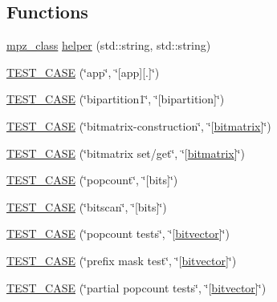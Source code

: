 \subsection*{Functions}
\begin{DoxyCompactItemize}
\item 
\hyperlink{gmpxx_8h_a4194ba637e08ba88fb6b56747cc0ee6c}{mpz\+\_\+class} \hyperlink{namespaceterraces_1_1tests_a740352dfa946b8680c3c25e0edbc87a9}{helper} (std\+::string, std\+::string)
\item 
\hyperlink{namespaceterraces_1_1tests_a111cb207ffb8995599c26f3410048b18}{T\+E\+S\+T\+\_\+\+C\+A\+SE} (\char`\"{}app\char`\"{}, \char`\"{}\mbox{[}app\mbox{]}\mbox{[}.\mbox{]}\char`\"{})
\item 
\hyperlink{namespaceterraces_1_1tests_ac0c9710c96ea85570fdc62053e2f9f0a}{T\+E\+S\+T\+\_\+\+C\+A\+SE} (\char`\"{}bipartition1\char`\"{}, \char`\"{}\mbox{[}bipartition\mbox{]}\char`\"{})
\item 
\hyperlink{namespaceterraces_1_1tests_ae3c8fba3392d2b675ea99655118666ce}{T\+E\+S\+T\+\_\+\+C\+A\+SE} (\char`\"{}bitmatrix-\/construction\char`\"{}, \char`\"{}\mbox{[}\hyperlink{classterraces_1_1bitmatrix}{bitmatrix}\mbox{]}\char`\"{})
\item 
\hyperlink{namespaceterraces_1_1tests_ac79b8331c2eaef1acc013d8c6ca2cacb}{T\+E\+S\+T\+\_\+\+C\+A\+SE} (\char`\"{}bitmatrix set/get\char`\"{}, \char`\"{}\mbox{[}\hyperlink{classterraces_1_1bitmatrix}{bitmatrix}\mbox{]}\char`\"{})
\item 
\hyperlink{namespaceterraces_1_1tests_a9280d3575eba24f61dedca5db6e1a9bc}{T\+E\+S\+T\+\_\+\+C\+A\+SE} (\char`\"{}popcount\char`\"{}, \char`\"{}\mbox{[}bits\mbox{]}\char`\"{})
\item 
\hyperlink{namespaceterraces_1_1tests_a57f3cdb3eb4bcc7137dc6ad50041c4db}{T\+E\+S\+T\+\_\+\+C\+A\+SE} (\char`\"{}bitscan\char`\"{}, \char`\"{}\mbox{[}bits\mbox{]}\char`\"{})
\item 
\hyperlink{namespaceterraces_1_1tests_a4e2937251b4a5a4f3a896ffdcb7403d0}{T\+E\+S\+T\+\_\+\+C\+A\+SE} (\char`\"{}popcount tests\char`\"{}, \char`\"{}\mbox{[}\hyperlink{namespaceterraces_a1b526fb554dff829f7ad51eb21d5ed06}{bitvector}\mbox{]}\char`\"{})
\item 
\hyperlink{namespaceterraces_1_1tests_a96ea67194c7b086b7e0194b5cceb4e1e}{T\+E\+S\+T\+\_\+\+C\+A\+SE} (\char`\"{}prefix mask test\char`\"{}, \char`\"{}\mbox{[}\hyperlink{namespaceterraces_a1b526fb554dff829f7ad51eb21d5ed06}{bitvector}\mbox{]}\char`\"{})
\item 
\hyperlink{namespaceterraces_1_1tests_ab80b158e8759dd9d2cc79073d2a81a9a}{T\+E\+S\+T\+\_\+\+C\+A\+SE} (\char`\"{}partial popcount tests\char`\"{}, \char`\"{}\mbox{[}\hyperlink{namespaceterraces_a1b526fb554dff829f7ad51eb21d5ed06}{bitvector}\mbox{]}\char`\"{})

\end{DoxyCompactItemize}

